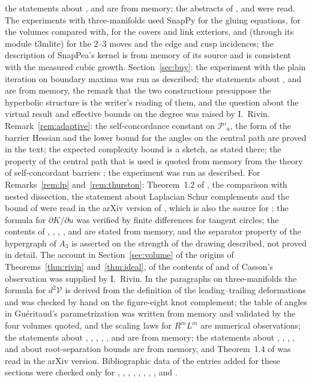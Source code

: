 \documentclass[11pt]{amsart}
\theoremstyle{definition}
\theoremstyle{remark}
\begin{document}
the statements about \cite{BPS15,Spr20}, \cite{Pen87} and \cite{Riv94b} are from memory; the abstracts of \cite{Riv25}, \cite{Bel21} and \cite{Luo10} were read. The experiments with three-manifolds used SnapPy for the gluing equations, for the volumes compared with, for the covers and link exteriors, and (through its module t3mlite) for the $2$--$3$ moves and the edge and cusp incidences; the description of SnapPea's kernel is from memory of its source and is consistent with the measured cubic growth.
Section~\ref{sec:buy}: the experiment with the plain iteration on boundary maxima was run as described; the statements about \cite{HRS12}, \cite{LST08} and \cite{BR10} are from memory, the remark that the two constructions presuppose the hyperbolic structure is the writer's reading of them, and the question about the virtual result and effective bounds on the degree was raised by I.~Rivin.
Remark~\ref{rem:adaptive}: the self-concordance constant on $\mathcal P'_a$, the form of the barrier Hessian and the lower bound for the angles on the central path are proved in the text; the expected complexity bound is a sketch, as stated there; the property of the central path that is used is quoted from memory from the theory of self-concordant barriers \cite{NN94}; the experiment was run as described.
For Remarks~\ref{rem:lp} and~\ref{rem:thurston}: Theorem~1.2 of \cite{DGLSY24}, the comparison with nested dissection, the statement about Laplacian Schur complements and the bound of \cite{DGGLPSY22} were read in the arXiv version of \cite{DGLSY24}, which is also the source for \cite{DKZ22};
the formula for $\partial K/\partial u$ was verified by finite differences for tangent circles; the contents of \cite{BKMNW17}, \cite{BCPT05}, \cite{CdV91}, \cite{CL03}, \cite{Ge18} and \cite{OSC17} are stated from memory, and the separator property of the hypergraph of $A_3$ is asserted on the strength of the drawing described, not proved in detail.
The account in Section~\ref{sec:volume} of the origins of Theorems~\ref{thm:rivin} and~\ref{thm:ideal}, of the contents of \cite{Riv03} and of Casson's observation was supplied by I.~Rivin. In the paragraphs on three-manifolds the formula for $d^2\mathcal V$ is derived from the definition of the leading--trailing deformations
and was checked by hand on the figure-eight knot complement; the table of angles in Gu\'eritaud's parametrization was written from memory and validated by the four volumes quoted, and the scaling laws for $R^mL^m$ are numerical observations; the statements about \cite{Ago11}, \cite{HRST11}, \cite{HIS16}, \cite{Gue06}, \cite{FH82}, \cite{Lac03} and \cite{Bro03b} are from memory; the statements about \cite{NZ85}, \cite{LT08}, \cite{HSW19}, \cite{GS10}, \cite{HIKMOT16} and about root-separation bounds are from memory, and Theorem~1.4 of \cite{DGLSY24} was read in the arXiv version.
Bibliographic data of the entries added for these sections were checked only for \cite{DGLSY24}, \cite{DGGLPSY22}, \cite{DKZ22}, \cite{OSC17}, \cite{Aha97}, \cite{Han88}, \cite{He99}, \cite{CS03}, \cite{DP19} and \cite{Bro03}.
\end{document}
